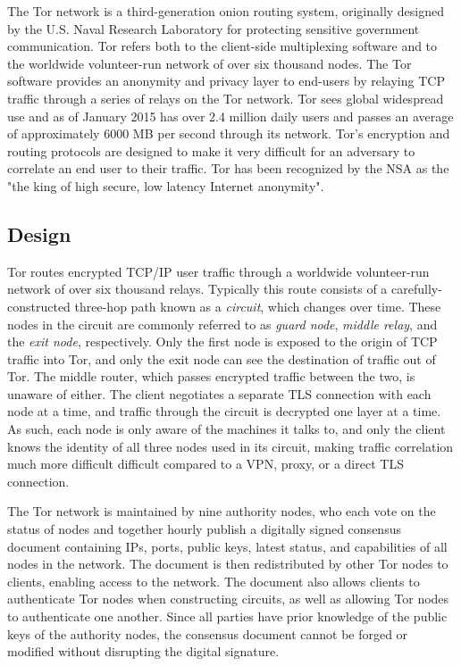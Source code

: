 The Tor network is a third-generation onion routing system, originally designed by the U.S. Naval Research Laboratory for protecting sensitive government communication. Tor refers both to the client-side multiplexing software and to the worldwide volunteer-run network of over six thousand nodes. The Tor software provides an anonymity and privacy layer to end-users by relaying TCP traffic through a series of relays on the Tor network. Tor sees global widespread use and as of January 2015 has over 2.4 million daily users and passes an average of approximately 6000 MB per second through its network.\cite{TorMetrics} Tor's encryption and routing protocols are designed to make it very difficult for an adversary to correlate an end user to their traffic. Tor has been recognized by the NSA as the "the king of high secure, low latency Internet anonymity".\cite{TorSlidesNSA}

\subsection{Design}

Tor routes encrypted TCP/IP user traffic through a worldwide volunteer-run network of over six thousand relays. Typically this route consists of a carefully-constructed three-hop path known as a \textit{circuit}, which changes over time. These nodes in the circuit are commonly referred to as \textit{guard node}, \textit{middle relay}, and the \textit{exit node}, respectively. Only the first node is exposed to the origin of TCP traffic into Tor, and only the exit node can see the destination of traffic out of Tor. The middle router, which passes encrypted traffic between the two, is unaware of either. The client negotiates a separate TLS connection with each node at a time, and traffic through the circuit is decrypted one layer at a time. As such, each node is only aware of the machines it talks to, and only the client knows the identity of all three nodes used in its circuit, making traffic correlation much more difficult difficult compared to a VPN, proxy, or a direct TLS connection.

The Tor network is maintained by nine authority nodes, who each vote on the status of nodes and together hourly publish a digitally signed consensus document containing IPs, ports, public keys, latest status, and capabilities of all nodes in the network. The document is then redistributed by other Tor nodes to clients, enabling access to the network. The document also allows clients to authenticate Tor nodes when constructing circuits, as well as allowing Tor nodes to authenticate one another. Since all parties have prior knowledge of the public keys of the authority nodes, the consensus document cannot be forged or modified without disrupting the digital signature.\cite{xin2009design}

